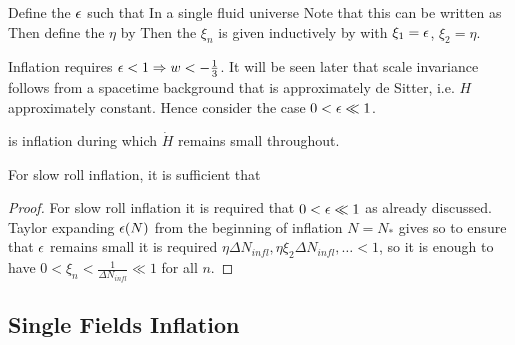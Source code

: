 \documentclass{article}
\begin{document}
\begin{definition}
Define the  $\epsilon$ such that 
In a single fluid universe 
Note that this can be written as 
Then define the  $\eta$ by 
Then the  $\xi_n$ is given inductively by 
with $\xi_1 = \epsilon$, $\xi_2 = \eta$. 
\end{definition}

Inflation requires $\epsilon < 1 \Rightarrow w < -\frac{1}{3}$. It will be seen later that scale invariance follows from a spacetime background that is approximately de Sitter, i.e. $H$ approximately constant. Hence consider the case $0< \epsilon \ll 1$. 

\begin{definition}
 is inflation during which $\dot{H}$ remains small throughout.
\end{definition}

\begin{prop}
For slow roll inflation, it is sufficient that 
\end{prop}
\begin{proof}
For slow roll inflation it is required that $0 < \epsilon \ll 1$ as already discussed. Taylor expanding $\epsilon(N)$ from the beginning of inflation $N=N_\ast$ gives 
so to ensure that $\epsilon$ remains small it is required $\eta \Delta N_{infl}, \eta \xi_2 \Delta N_{infl}, \dots < 1$, so it is enough to have $0<\xi_n < \frac{1}{\Delta N_{infl}} \ll 1$ for all $n$. 
\end{proof}

\subsection{Single Fields Inflation}
\end{document}
